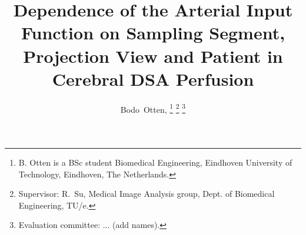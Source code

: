 \documentclass[journal]{IEEEtran}
\begin{document}
% 

\title{Dependence of the Arterial Input Function on Sampling Segment, Projection View and Patient in Cerebral DSA Perfusion}

\author{Bodo~Otten,
  \thanks{B. Otten is a BSc student Biomedical Engineering, Eindhoven University of Technology, Eindhoven, The Netherlands.}%
  \thanks{Supervisor: R.~Su, Medical Image Analysis group, Dept. of Biomedical Engineering, TU/e.}%
  \thanks{Evaluation committee: ... (add names).}}


\maketitle












\clearpage
\appendices





\end{document}
